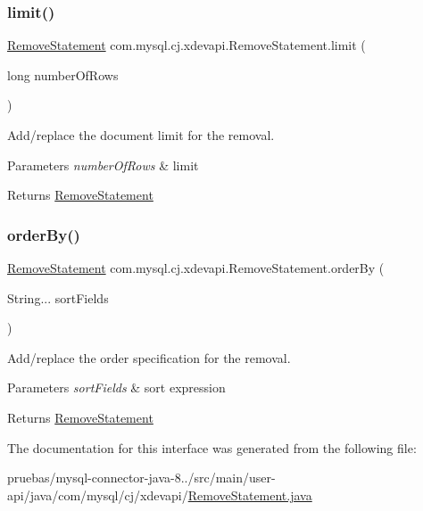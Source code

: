\subsubsection{\texorpdfstring{limit()}{limit()}}
{\footnotesize\ttfamily \mbox{\hyperlink{interfacecom_1_1mysql_1_1cj_1_1xdevapi_1_1_remove_statement}{Remove\+Statement}} com.\+mysql.\+cj.\+xdevapi.\+Remove\+Statement.\+limit (\begin{DoxyParamCaption}\item[{long}]{number\+Of\+Rows }\end{DoxyParamCaption})}

Add/replace the document limit for the removal.


\begin{DoxyParams}{Parameters}
{\em number\+Of\+Rows} & limit \\
\hline
\end{DoxyParams}
\begin{DoxyReturn}{Returns}
\mbox{\hyperlink{interfacecom_1_1mysql_1_1cj_1_1xdevapi_1_1_remove_statement}{Remove\+Statement}} 
\end{DoxyReturn}
\mbox{\label{interfacecom_1_1mysql_1_1cj_1_1xdevapi_1_1_remove_statement_a98adae04f69c2128a44d1c766f00a5f2}} 
\subsubsection{\texorpdfstring{order\+By()}{orderBy()}}
{\footnotesize\ttfamily \mbox{\hyperlink{interfacecom_1_1mysql_1_1cj_1_1xdevapi_1_1_remove_statement}{Remove\+Statement}} com.\+mysql.\+cj.\+xdevapi.\+Remove\+Statement.\+order\+By (\begin{DoxyParamCaption}\item[{String...}]{sort\+Fields }\end{DoxyParamCaption})}

Add/replace the order specification for the removal.


\begin{DoxyParams}{Parameters}
{\em sort\+Fields} & sort expression \\
\hline
\end{DoxyParams}
\begin{DoxyReturn}{Returns}
\mbox{\hyperlink{interfacecom_1_1mysql_1_1cj_1_1xdevapi_1_1_remove_statement}{Remove\+Statement}} 
\end{DoxyReturn}


The documentation for this interface was generated from the following file\+:\begin{DoxyCompactItemize}
\item 
pruebas/mysql-\/connector-\/java-\/8../src/main/user-\/api/java/com/mysql/cj/xdevapi/\mbox{\hyperlink{_remove_statement_8java}{Remove\+Statement.\+java}}\end{DoxyCompactItemize}
